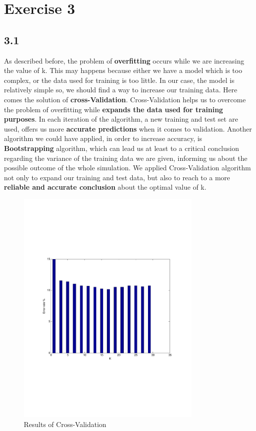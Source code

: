 \documentclass[letterpaper,11pt]{article}
\begin{document}
 \section*{Exercise 3}
 \subsection*{3.1}
As described before, the problem of \textbf{overfitting} occurs while we are increasing the value of k. This may happens because either we have a model which is too complex, or the data used for training is too little. In our case, the model is relatively simple so, we should find a way to increase our training data. Here comes the solution of \textbf{cross-Validation}. Cross-Validation helps us to overcome the problem of overfitting while \textbf{expands the data used for training purposes}. In each iteration of the algorithm, a new training and test set are used, offers us more \textbf{accurate predictions} when it comes to validation. Another algorithm we could have applied, in order to increase accuracy, is \textbf{Bootstrapping} algorithm, which can lead us at least to a critical conclusion regarding the variance of the training data we are given, informing us about the possible outcome of the whole simulation. We applied Cross-Validation algorithm not only to expand our training and test data, but also to reach to a more \textbf{reliable and accurate conclusion} about the optimal value of k. 


\begin{figure}[!h]
\centering
  \includegraphics[trim = 0cm 7cm 0cm 7cm, clip, width=0.8\textwidth]{figures/CrossValResults.pdf}
  \caption{Results of Cross-Validation}
  \label{fig:4}
\end{figure}
\end{document}
